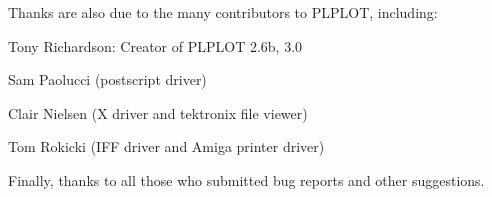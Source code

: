 Thanks are also due to the many contributors to PLPLOT, including:
\begin{description}
\item Tony Richardson: Creator of PLPLOT 2.6b, 3.0
\item Sam Paolucci (postscript driver)
\item Clair Nielsen (X driver and tektronix file viewer)
\item Tom Rokicki (IFF driver and Amiga printer driver)
\end{description}

Finally, thanks to all those who submitted bug reports and other
suggestions.
